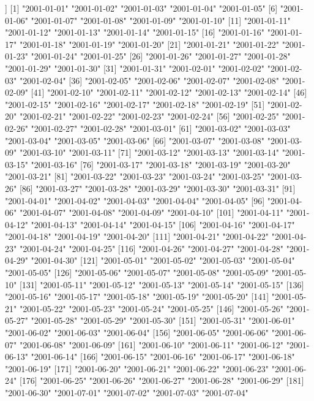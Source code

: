 \documentclass[
]{jss}
\begin{document}
\begin{CodeChunk}
\begin{CodeOutput}
[[3]]
  [1] "2001-01-01" "2001-01-02" "2001-01-03" "2001-01-04" "2001-01-05"
  [6] "2001-01-06" "2001-01-07" "2001-01-08" "2001-01-09" "2001-01-10"
 [11] "2001-01-11" "2001-01-12" "2001-01-13" "2001-01-14" "2001-01-15"
 [16] "2001-01-16" "2001-01-17" "2001-01-18" "2001-01-19" "2001-01-20"
 [21] "2001-01-21" "2001-01-22" "2001-01-23" "2001-01-24" "2001-01-25"
 [26] "2001-01-26" "2001-01-27" "2001-01-28" "2001-01-29" "2001-01-30"
 [31] "2001-01-31" "2001-02-01" "2001-02-02" "2001-02-03" "2001-02-04"
 [36] "2001-02-05" "2001-02-06" "2001-02-07" "2001-02-08" "2001-02-09"
 [41] "2001-02-10" "2001-02-11" "2001-02-12" "2001-02-13" "2001-02-14"
 [46] "2001-02-15" "2001-02-16" "2001-02-17" "2001-02-18" "2001-02-19"
 [51] "2001-02-20" "2001-02-21" "2001-02-22" "2001-02-23" "2001-02-24"
 [56] "2001-02-25" "2001-02-26" "2001-02-27" "2001-02-28" "2001-03-01"
 [61] "2001-03-02" "2001-03-03" "2001-03-04" "2001-03-05" "2001-03-06"
 [66] "2001-03-07" "2001-03-08" "2001-03-09" "2001-03-10" "2001-03-11"
 [71] "2001-03-12" "2001-03-13" "2001-03-14" "2001-03-15" "2001-03-16"
 [76] "2001-03-17" "2001-03-18" "2001-03-19" "2001-03-20" "2001-03-21"
 [81] "2001-03-22" "2001-03-23" "2001-03-24" "2001-03-25" "2001-03-26"
 [86] "2001-03-27" "2001-03-28" "2001-03-29" "2001-03-30" "2001-03-31"
 [91] "2001-04-01" "2001-04-02" "2001-04-03" "2001-04-04" "2001-04-05"
 [96] "2001-04-06" "2001-04-07" "2001-04-08" "2001-04-09" "2001-04-10"
[101] "2001-04-11" "2001-04-12" "2001-04-13" "2001-04-14" "2001-04-15"
[106] "2001-04-16" "2001-04-17" "2001-04-18" "2001-04-19" "2001-04-20"
[111] "2001-04-21" "2001-04-22" "2001-04-23" "2001-04-24" "2001-04-25"
[116] "2001-04-26" "2001-04-27" "2001-04-28" "2001-04-29" "2001-04-30"
[121] "2001-05-01" "2001-05-02" "2001-05-03" "2001-05-04" "2001-05-05"
[126] "2001-05-06" "2001-05-07" "2001-05-08" "2001-05-09" "2001-05-10"
[131] "2001-05-11" "2001-05-12" "2001-05-13" "2001-05-14" "2001-05-15"
[136] "2001-05-16" "2001-05-17" "2001-05-18" "2001-05-19" "2001-05-20"
[141] "2001-05-21" "2001-05-22" "2001-05-23" "2001-05-24" "2001-05-25"
[146] "2001-05-26" "2001-05-27" "2001-05-28" "2001-05-29" "2001-05-30"
[151] "2001-05-31" "2001-06-01" "2001-06-02" "2001-06-03" "2001-06-04"
[156] "2001-06-05" "2001-06-06" "2001-06-07" "2001-06-08" "2001-06-09"
[161] "2001-06-10" "2001-06-11" "2001-06-12" "2001-06-13" "2001-06-14"
[166] "2001-06-15" "2001-06-16" "2001-06-17" "2001-06-18" "2001-06-19"
[171] "2001-06-20" "2001-06-21" "2001-06-22" "2001-06-23" "2001-06-24"
[176] "2001-06-25" "2001-06-26" "2001-06-27" "2001-06-28" "2001-06-29"
[181] "2001-06-30" "2001-07-01" "2001-07-02" "2001-07-03" "2001-07-04"

\end{CodeOutput}
\end{CodeChunk}
\end{document}
